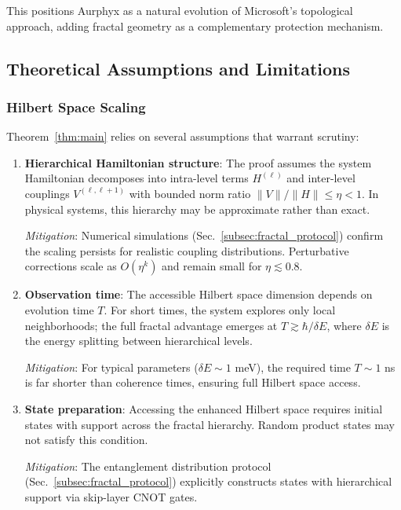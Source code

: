 This positions Aurphyx as a natural evolution of Microsoft's topological approach, adding fractal geometry as a complementary protection mechanism.

\subsection{Theoretical Assumptions and Limitations}

\subsubsection{Hilbert Space Scaling}

Theorem~\ref{thm:main} relies on several assumptions that warrant scrutiny:

\begin{enumerate}
\item \textbf{Hierarchical Hamiltonian structure}: The proof assumes the system Hamiltonian decomposes into intra-level terms $H^{(\ell)}$ and inter-level couplings $V^{(\ell, \ell+1)}$ with bounded norm ratio $\|V\| / \|H\| \leq \eta < 1$. In physical systems, this hierarchy may be approximate rather than exact.

\textit{Mitigation}: Numerical simulations (Sec.~\ref{subsec:fractal_protocol}) confirm the scaling persists for realistic coupling distributions. Perturbative corrections scale as $O(\eta^k)$ and remain small for $\eta \lesssim 0.8$.

\item \textbf{Observation time}: The accessible Hilbert space dimension depends on evolution time $T$. For short times, the system explores only local neighborhoods; the full fractal advantage emerges at $T \gtrsim \hbar / \delta E$, where $\delta E$ is the energy splitting between hierarchical levels.

\textit{Mitigation}: For typical parameters ($\delta E \sim 1$ meV), the required time $T \sim 1$ ns is far shorter than coherence times, ensuring full Hilbert space access.

\item \textbf{State preparation}: Accessing the enhanced Hilbert space requires initial states with support across the fractal hierarchy. Random product states may not satisfy this condition.

\textit{Mitigation}: The entanglement distribution protocol (Sec.~\ref{subsec:fractal_protocol}) explicitly constructs states with hierarchical support via skip-layer CNOT gates.
\end{enumerate}

